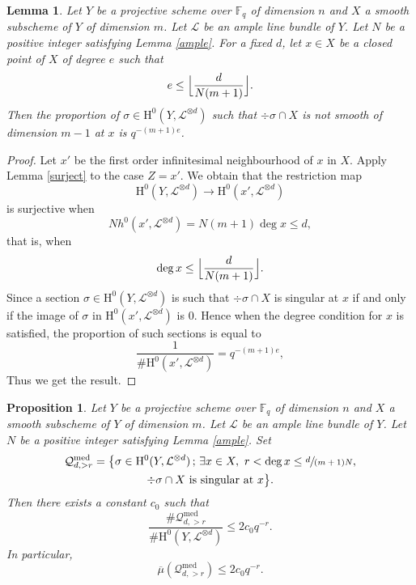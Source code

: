 \documentclass[JEP,XML,SOM,Unicode,published]{cedram}
\newcommand{\sep}{\,;\,}
\theoremstyle{plain}
\newtheorem{lem}[thm]{Lemma}
\newtheorem{prop}[thm]{Proposition}
\theoremstyle{definition}
\newcommand{\ho}{\mathrm{H}}
\newcommand{\li}{\mathcal{L}}
\newcommand{\F}{\mathbb{F}}
\begin{document}

\begin{lem}\label{singpt}
Let $Y$ be a projective scheme over $\F_q$ of dimension $n$ and $X$ a smooth subscheme of $Y$ of dimension $m$. Let $\li$ be an ample line bundle of $Y$. Let $N$ be a positive integer satisfying Lemma \ref{ample}. For a fixed $d$, let $x\in X$ be a closed point of $X$ of degree $e$ such that
\[
e\leq \Bigl\lfloor \frac{d}{N(m+1)} \Bigr\rfloor.
\]
Then the proportion of $\sigma\in \ho^0(Y, \li^{\otimes d})$ such that $\div \sigma\cap X$ is not smooth of dimension $m-1$ at $x$ is $q^{-(m+1)e}$.
\end{lem}
\begin{proof}
Let $x'$ be the first order infinitesimal neighbourhood of $x$ in $X$. Apply Lemma \ref{surject} to the case $Z=x'$. We obtain that the restriction map
\[
\ho^0(Y, \li^{\otimes d})\to \ho^0(x', \li^{\otimes d})
\]
is surjective when
\[
Nh^0(x', \li^{\otimes d})=N(m+1)\deg x\leq d,
\]
that is, when
\[
\deg x\leq \Bigl\lfloor \frac{d}{N(m+1)} \Bigr\rfloor.
\]
Since a section $\sigma\in \ho^0(Y, \li^{\otimes d})$ is such that $\div \sigma\cap X$ is singular at $x$ if and only if the image of $\sigma$ in $\ho^0(x', \li^{\otimes d})$ is $0$. Hence when the degree condition for $x$ is satisfied, the proportion of such sections is equal to
\[
\frac{1}{\#\ho^0(x', \li^{\otimes d})}=q^{-(m+1)e},
\]
Thus we get the result.
\end{proof}
\begin{prop} \label{mediumf}
Let $Y$ be a projective scheme over $\F_q$ of dimension $n$ and $X$ a smooth subscheme of $Y$ of dimension $m$. Let $\li$ be an ample line bundle of $Y$. Let $N$ be a positive integer satisfying Lemma \ref{ample}. Set\vspace*{-3pt}
\begin{multline*}
\mathcal{Q}_{d, >r}^{\mathrm{med}} = \bigl\{ \sigma\in \ho^0(Y,\li^{\otimes d})\sep \exists x\in X,\ r<\deg x\leq \sfrac{d}{(m+1)N},\\ \div \sigma\cap X \text{ is singular at }x \bigl\}.
\end{multline*}
Then there exists a constant $c_0$ such that
\[
\frac{\#\mathcal{Q}_{d, >r}^{\mathrm{med}}}{\# \ho^0(Y, \mathcal{L}^{\otimes d})} \leq 2c_0q^{-r}.
\]
In particular,\vspace*{-3pt}
\[
\overline{\mu}(\mathcal{Q}_{d, >r}^{\mathrm{med}})\leq 2c_0q^{-r}.
\]
\end{prop}
\end{document}
